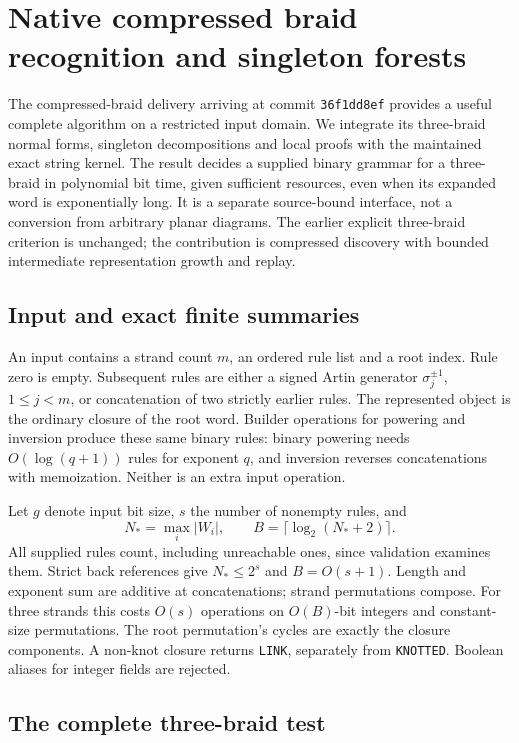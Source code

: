 \section{Native compressed braid recognition and singleton forests}
\label{sec:compressed-braid}

The compressed-braid delivery arriving at commit \texttt{36f1dd8ef}
provides a useful complete algorithm on a restricted input domain.
We integrate its three-braid normal forms, singleton decompositions and local
proofs with the maintained exact string kernel. The result decides a supplied
binary grammar for a three-braid in polynomial bit time, given sufficient
resources, even when its expanded word is exponentially long. It is a separate
source-bound interface, not a conversion from arbitrary planar diagrams.
The earlier explicit three-braid criterion is unchanged; the contribution is
compressed discovery with bounded intermediate representation growth and replay.

\subsection{Input and exact finite summaries}

An input contains a strand count $m$, an ordered rule list and a root index.
Rule zero is empty. Subsequent rules are either a signed Artin generator
$\sigma_j^{\pm1}$, $1\le j<m$, or concatenation of two strictly earlier rules.
The represented object is the ordinary closure of the root word. Builder
operations for powering and inversion produce these same binary rules:
binary powering needs $O(\log(q+1))$ rules for exponent $q$, and inversion
reverses concatenations with memoization. Neither is an extra input operation.

Let $g$ denote input bit size, $s$ the number of nonempty rules, and
\[
 N_* = \max_i |W_i|,\qquad
 B=\lceil\log_2(N_*+2)\rceil.
\]
All supplied rules count, including unreachable ones, since validation examines
them. Strict back references give $N_*\le 2^s$ and $B=O(s+1)$.
Length and exponent sum are additive at concatenations; strand permutations
compose. For three strands this costs $O(s)$ operations on $O(B)$-bit integers
and constant-size permutations. The root permutation's cycles are exactly the
closure components. A non-knot closure returns \texttt{LINK}, separately from
\texttt{KNOTTED}. Boolean aliases for integer fields are rejected.

\subsection{The complete three-braid test}

